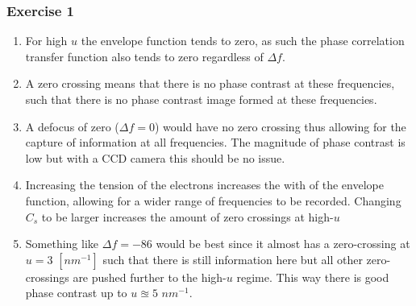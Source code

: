 \documentclass[a4paper]{scrartcl}
\begin{document}
\subsubsection*{Exercise 1}
\begin{enumerate}
  \item For high $u$ the envelope function tends to zero, as such the phase correlation transfer function also tends to zero regardless of $\Delta f$.
  \item A zero crossing means that there is no phase contrast at these frequencies, such that there is no phase contrast image formed at these frequencies.
  \item A defocus of zero ($\Delta f = 0$) would have no zero crossing thus allowing for the capture of information at all frequencies. The magnitude of phase contrast is low but with a CCD camera this should be no issue.
  \item Increasing the tension of the electrons increases the with of the envelope function, allowing for a wider range of frequencies to be recorded. Changing $C_s$ to be larger increases the amount of zero crossings at high-$u$
  \item Something like $\Delta f = -86$ would be best since it almost has a zero-crossing at $u=3$ $[nm^{-1}]$ such that there is still information here but all other zero-crossings are pushed further to the high-$u$ regime. This way there is good phase contrast up to $u \approxeq 5$ $nm^{-1}$.
\end{enumerate}
\end{document}
